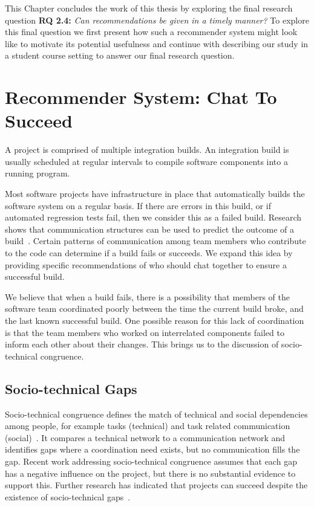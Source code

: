 \label{chap:actionable}
This Chapter concludes the work of this thesis by exploring the final research question \textbf{RQ 2.4:} \emph{Can recommendations be given in a timely manner?}
To explore this final question we first present how such a recommender system might look like to motivate its potential usefulness and continue with describing our study in a student course setting to answer our final research question.

\section{Recommender System: Chat To Succeed}

A project is comprised of multiple integration builds. 
An integration build is usually scheduled at regular intervals to compile software components into a running program. 

Most software projects have infrastructure in place that automatically builds the software system on a regular basis. If there are errors in this build, or if automated regression tests fail, then we consider this as a failed build.  
Research shows that communication structures can be used to predict the outcome of a build~\cite{wolf:tr2008}.  
Certain patterns of communication among team members who contribute to the code can determine if a build fails or succeeds. 
We expand this idea by providing specific recommendations of who should chat together to ensure a successful build.

We believe that when a build fails, there is a possibility that members of the software team coordinated poorly between the time the current build broke, and the last known successful build. 
One possible reason for this lack of coordination is that the team members who worked on interrelated components failed to inform each other about their changes. 
This brings us to the discussion of socio-technical congruence.


\subsection{Socio-technical Gaps}


Socio-technical congruence defines the match of technical 
and social dependencies among people, for example tasks 
(technical) and task related communication (social)~\cite{cataldo:cscw:2006}. 
It compares a technical network to a communication network and identifies gaps where a coordination need exists, but no communication fills the gap. 
Recent work addressing socio-technical congruence assumes that each gap has a negative influence on the project, but there is no substantial evidence to support this. 
Further research has indicated that projects can succeed despite the existence of socio-technical gaps~\cite{marczak:re:2008}.

